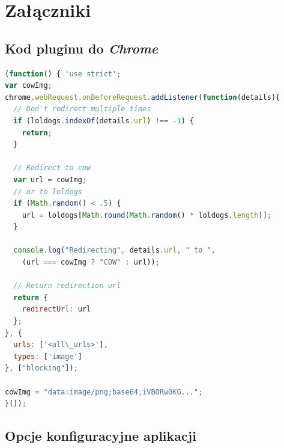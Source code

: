 \documentclass[a4paper,11pt]{scrartcl}
\begin{document}
\appendix
\section{Załączniki}
\subsection{Kod pluginu do \textit{Chrome}}
\label{appendix_impl}
\begin{lstlisting}[language={JavaScript}, label=lst_plugin_1,
  caption={Kod rozszerzenia dla przeglądarki Chrome, realizujący \textit{proof-of-concept}.}]
(function() { 'use strict';
var cowImg;
chrome.webRequest.onBeforeRequest.addListener(function(details){
  // Don't redirect multiple times
  if (loldogs.indexOf(details.url) !== -1) {
    return;
  }
  
  // Redirect to cow
  var url = cowImg;
  // or to loldogs
  if (Math.random() < .5) {
    url = loldogs[Math.round(Math.random() * loldogs.length)];
  }
  
  console.log("Redirecting", details.url, " to ", 
    (url === cowImg ? "COW" : url));
    
  // Return redirection url
  return {
    redirectUrl: url
  };
}, {
  urls: ['<all\_urls>'],
  types: ['image']
}, ["blocking"]);

cowImg = "data:image/png;base64,iVBORw0KG...";
}());
\end{lstlisting}

\subsection{Opcje konfiguracyjne aplikacji}
\label{appendix_options}
\end{document}

